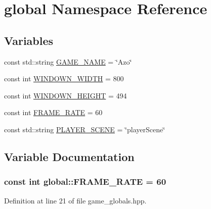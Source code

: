 \hypertarget{namespaceglobal}{}\section{global Namespace Reference}
\label{namespaceglobal}
\subsection*{Variables}
\begin{DoxyCompactItemize}
\item 
const std\+::string \hyperlink{namespaceglobal_af594ce445ad5359fcf3bb29aca258017}{G\+A\+M\+E\+\_\+\+N\+A\+ME} = \char`\"{}Azo\char`\"{}
\item 
const int \hyperlink{namespaceglobal_aa3c3915b40bcdd45215dc8f878b96952}{W\+I\+N\+D\+O\+W\+N\+\_\+\+W\+I\+D\+TH} = 800
\item 
const int \hyperlink{namespaceglobal_a95b063ce316252a17eb13e6ed4e9e257}{W\+I\+N\+D\+O\+W\+N\+\_\+\+H\+E\+I\+G\+HT} = 494
\item 
const int \hyperlink{namespaceglobal_a32de592fe67acbc0c90061e1664662d6}{F\+R\+A\+M\+E\+\_\+\+R\+A\+TE} = 60
\item 
const std\+::string \hyperlink{namespaceglobal_a0ea2b548b86e5f30a4d4c54be44973e6}{P\+L\+A\+Y\+E\+R\+\_\+\+S\+C\+E\+NE} = \char`\"{}player\+Scene\char`\"{}
\end{DoxyCompactItemize}


\subsection{Variable Documentation}
\subsubsection[{\texorpdfstring{F\+R\+A\+M\+E\+\_\+\+R\+A\+TE}{FRAME_RATE}}]{\setlength{\rightskip}{0pt plus 5cm}const int global\+::\+F\+R\+A\+M\+E\+\_\+\+R\+A\+TE = 60}\hypertarget{namespaceglobal_a32de592fe67acbc0c90061e1664662d6}{}\label{namespaceglobal_a32de592fe67acbc0c90061e1664662d6}


Definition at line 21 of file game\+\_\+globals.\+hpp.

